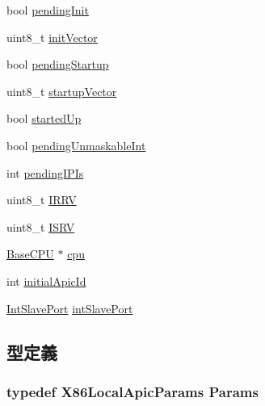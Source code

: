 \begin{DoxyCompactItemize}
\item 
bool \hyperlink{classX86ISA_1_1Interrupts_a3c53994e08d31f19e9ee2400effd6f5e}{pendingInit}
\item 
uint8\_\-t \hyperlink{classX86ISA_1_1Interrupts_a3e21475b0787502498afda4c6931da0c}{initVector}
\item 
bool \hyperlink{classX86ISA_1_1Interrupts_aa6f1c7032da250f8932f9856dcda20f0}{pendingStartup}
\item 
uint8\_\-t \hyperlink{classX86ISA_1_1Interrupts_af7c23ab865f682ddda21c75170de1126}{startupVector}
\item 
bool \hyperlink{classX86ISA_1_1Interrupts_a46feb43d5deb6cf7bcd3f142d7dc11da}{startedUp}
\item 
bool \hyperlink{classX86ISA_1_1Interrupts_a0725ba3c06fc82e5da0f8800ed5eae68}{pendingUnmaskableInt}
\item 
int \hyperlink{classX86ISA_1_1Interrupts_aef75f0fcb528c2f7cafdf0fa0dcccb40}{pendingIPIs}
\item 
uint8\_\-t \hyperlink{classX86ISA_1_1Interrupts_aded378249f3df42588aede301cf2ae4a}{IRRV}
\item 
uint8\_\-t \hyperlink{classX86ISA_1_1Interrupts_a89802b4867c1ebeb92a413ec679732c9}{ISRV}
\item 
\hyperlink{classBaseCPU}{BaseCPU} $\ast$ \hyperlink{classX86ISA_1_1Interrupts_a7a31ca9fefb2fe821f29a270678912db}{cpu}
\item 
int \hyperlink{classX86ISA_1_1Interrupts_adde09bc135bea2df205ff1ddc88d8fe6}{initialApicId}
\item 
\hyperlink{classX86ISA_1_1IntDevice_1_1IntSlavePort}{IntSlavePort} \hyperlink{classX86ISA_1_1Interrupts_ae8b4c7c51db0b74d5e60b6db0ca0016c}{intSlavePort}
\end{DoxyCompactItemize}


\subsection{型定義}
\hypertarget{classX86ISA_1_1Interrupts_a3c48a671abef695247afdd48259ac20a}{
\subsubsection[{Params}]{\setlength{\rightskip}{0pt plus 5cm}typedef X86LocalApicParams {\bf Params}}}
\label{classX86ISA_1_1Interrupts_a3c48a671abef695247afdd48259ac20a}


